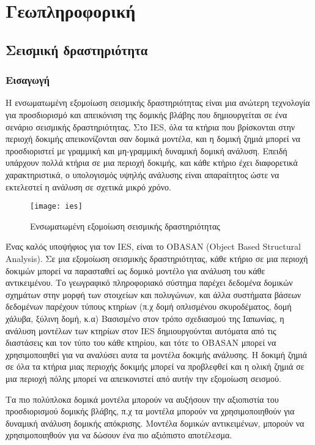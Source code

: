 \section{Γεωπληροφορική}

\subsection{Σεισμική δραστηριότητα}
\subsubsection{Εισαγωγή}
Η ενσωματωμένη εξομοίωση σεισμικής δραστηριότητας είναι μια ανώτερη τεχνολογία για προσδιορισμό και απεικόνιση της δομικής βλάβης που δημιουργείται σε ένα σενάριο σεισμικής δραστηριότητας. Στο IES, όλα τα κτήρια που βρίσκονται στην περιοχή δοκιμής απεικονίζονται σαν δομικά μοντέλα, και η δομική ζημιά μπορεί να προσδιοριστεί με γραμμική και μη-γραμμική δυναμική δομική ανάλυση. Επειδή υπάρχουν πολλά κτήρια σε μια περιοχή δοκιμής, και κάθε κτήριο έχει διαφορετικά χαρακτηριστικά, ο υπολογισμός υψηλής ανάλυσης είναι απαραίτητος ώστε να εκτελεστεί η ανάλυση σε σχετικά μικρό χρόνο.\cite{geoinformatics-1}

\begin{figure}[h]
\centering
\texttt{[image: ies]}
\caption{Ενσωματωμένη εξομοίωση σεισμικής δραστηριότητας}
\end{figure}

Ένας καλός υποψήφιος για τον IES, είναι το OBASAN (Object Based Structural Analysis). Σε μια εξομοίωση σεισμικής δραστηριότητας, κάθε κτήριο σε μια περιοχή δοκιμών μπορεί να παρασταθεί ως δομικό μοντέλο για ανάλυση του κάθε αντικειμένου. Το γεωγραφικό πληροφοριακό σύστημα παρέχει δεδομένα δομικών σχημάτων στην μορφή των στοιχείων και πολυγώνων, και άλλα συστήματα βάσεων δεδομένων παρέχουν τύπους κτηρίων (π.χ δομή οπλισμένου σκυροδέματος, δομή χάλυβα, ξύλινη δομή, κ.α) Βασισμένο στον τρόπο σχεδιασμού της Ιαπωνίας, η ανάλυση μοντέλων των κτηρίων στον IES δημιουργούνται αυτόματα από τις διαστάσεις και τον τύπο του κάθε κτηρίου, και τότε το OBASAN μπορεί να χρησιμοποιηθεί για να αναλύσει αυτα τα μοντέλα δοκιμής ανάλυσης. Η δοκιμή ζημιά σε όλα τα κτήρια μιας περιοχής δοκιμής μπορεί να προβλεφθεί και η ολική ζημιά σε μια περιοχή πόλης μπορεί να απεικονιστεί από αυτήν την εξομοίωση σεισμού.\cite{geoinformatics-2}\cite{geoinformatics-3}

Τα πιο πολύπλοκα δομικά μοντέλα μπορούν να αυξήσουν την αξιοπιστία του προσδιορισμού δομικής βλάβης, π.χ τα μοντέλα μπορούν να χρησιμοποιηθούν για δυναμική ανάλυση δομικής απόκρισης. Μοντέλα δομικών αντικειμένων, μπορούν να χρησιμοποιηθούν για να δώσουν ένα πιο αξιόπιστο αποτέλεσμα. 

